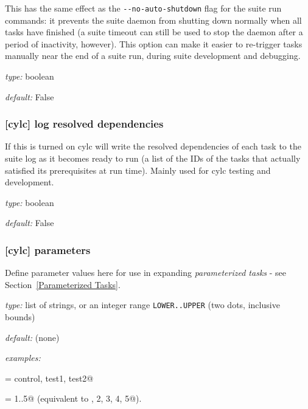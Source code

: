 This has the same effect as the \lstinline{--no-auto-shutdown} flag for
the suite run commands: it prevents the suite daemon from shutting down
normally when all tasks have finished (a suite timeout can still be used to
stop the daemon after a period of inactivity, however).  This option can
make it easier to re-trigger tasks manually near the end of a suite run,
during suite development and debugging.

\begin{myitemize}
    \item {\em type:} boolean
    \item {\em default:} False
\end{myitemize}

\subsubsection[log resolved dependencies]{[cylc] \textrightarrow log resolved dependencies}

If this is turned on cylc will write the resolved dependencies of each
task to the suite log as it becomes ready to run (a list of the IDs of
the tasks that actually satisfied its prerequisites at run time). Mainly
used for cylc testing and development.

\begin{myitemize}
    \item {\em type:} boolean
    \item {\em default:} False
\end{myitemize}

\subsubsection[parameters]{[cylc] \textrightarrow parameters}

Define parameter values here for use in expanding {\em parameterized tasks} -
see Section~\ref{Parameterized Tasks}.
\begin{myitemize}
    \item {\em type:} list of strings, or an integer range
        \lstinline=LOWER..UPPER= (two dots, inclusive bounds)
    \item {\em default:} (none)
    \item {\em examples:}
        \begin{myitemize}
            \item \lstinline@run = control, test1, test2@
            \item \lstinline@mem = 1..5@  (equivalent to , 2, 3, 4, 5@).
        \end{myitemize}
\end{myitemize}


